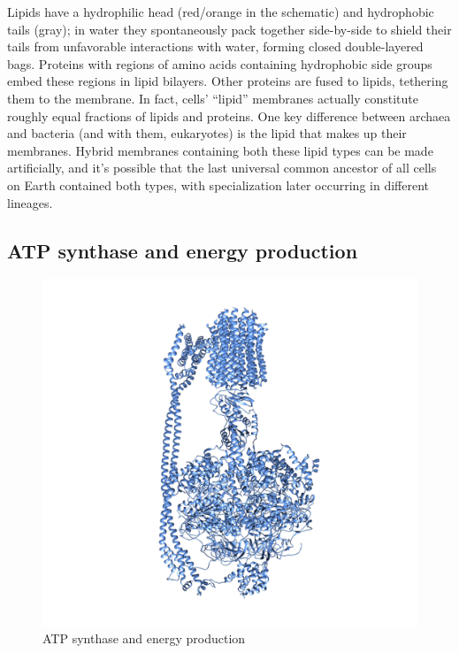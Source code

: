 \documentclass[]{tufte-book}
\begin{document}
Lipids have a hydrophilic head (red/orange in the schematic) and
hydrophobic tails (gray); in water they spontaneously pack together
side-by-side to shield their tails from unfavorable interactions with
water, forming closed double-layered bags. Proteins with regions of
amino acids containing hydrophobic side groups embed these regions in
lipid bilayers. Other proteins are fused to lipids, tethering them to
the membrane. In fact, cells' ``lipid'' membranes actually constitute
roughly equal fractions of lipids and proteins. One key difference
between archaea and bacteria (and with them, eukaryotes) is the lipid
that makes up their membranes. Hybrid membranes containing both these
lipid types can be made artificially, and it's possible that the last
universal common ancestor of all cells on Earth contained both types,
with specialization later occurring in different lineages.

\subsection{ATP synthase and energy
production}\label{atp-synthase-and-energy-production}

\begin{figure}
\includegraphics{img/02_schematic/2_1_2_ATPsynthase} \caption[ATP synthase and energy production]{ATP synthase and energy production}\label{fig:2-1-2}
\end{figure}
\end{document}
